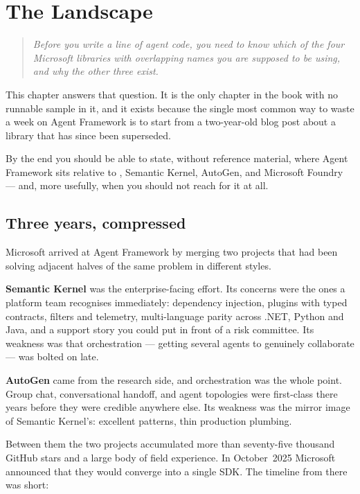 \chapter{The Landscape}
\label{ch:landscape}

\begin{quote}
\itshape
Before you write a line of agent code, you need to know which of the four
Microsoft libraries with overlapping names you are supposed to be using, and
why the other three exist.
\end{quote}

\noindent
This chapter answers that question. It is the only chapter in the book with no
runnable sample in it, and it exists because the single most common way to waste
a week on Agent Framework is to start from a two-year-old blog post about a
library that has since been superseded.

By the end you should be able to state, without reference material, where Agent
Framework sits relative to , Semantic Kernel,
AutoGen, and Microsoft Foundry --- and, more usefully, when you should not reach
for it at all.

\section{Three years, compressed}

Microsoft arrived at Agent Framework by merging two projects that had been
solving adjacent halves of the same problem in different styles.

\textbf{Semantic Kernel} was the enterprise-facing effort. Its concerns were the
ones a platform team recognises immediately: dependency injection, plugins with
typed contracts, filters and telemetry, multi-language parity across .NET, Python
and Java, and a support story you could put in front of a risk committee. Its
weakness was that orchestration --- getting several agents to genuinely
collaborate --- was bolted on late.

\textbf{AutoGen} came from the research side, and orchestration was the whole
point. Group chat, conversational handoff, and agent topologies were first-class
there years before they were credible anywhere else. Its weakness was the mirror
image of Semantic Kernel's: excellent patterns, thin production plumbing.

Between them the two projects accumulated more than seventy-five thousand GitHub
stars and a large body of field experience. In October~2025 Microsoft announced
that they would converge into a single SDK. The timeline from there was short:

